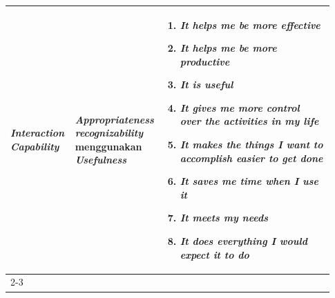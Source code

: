 \begin{longtable}{|p{0.2\linewidth}|p{0.2\linewidth}|p{0.53\linewidth}|}
      \textbf{\textit{Interaction Capability}}                    & \textbf{\textit{Appropriateness recognizability}} menggunakan \textbf{\textit{Usefulness}}                                                              & \begin{enumerate}[before=\vspace{-8pt}, leftmargin=*, nosep, series=UU] \item \textit{It helps me be more effective} \item \textit{It helps me be more productive} \item \textit{It is useful} \item \textit{It gives me more control over the activities in my life} \item \textit{It makes the things I want to accomplish easier to get done} \item \textit{It saves me time when I use it} \item \textit{It meets my needs} \item \textit{It does everything I would expect it to do} \end{enumerate}                                                                                                                                                                                                                                                                                                                                                                                                                                                                                                                                                                                                                                                                                                                                                                                                                                                                                                                    \\
      \cline{2-3}


\end{longtable}
